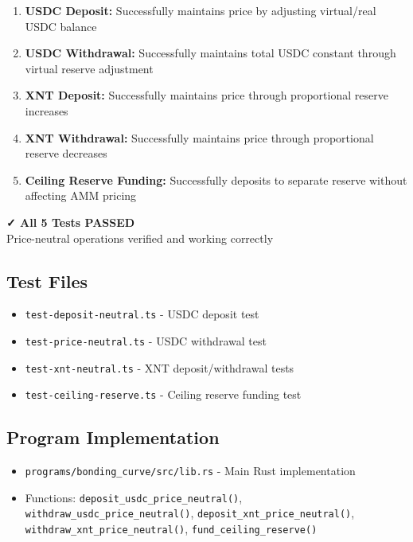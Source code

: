 \documentclass[11pt,a4paper]{article}
\begin{document}
\begin{enumerate}
    \item \textbf{USDC Deposit:} Successfully maintains price by adjusting virtual/real USDC balance
    \item \textbf{USDC Withdrawal:} Successfully maintains total USDC constant through virtual reserve adjustment
    \item \textbf{XNT Deposit:} Successfully maintains price through proportional reserve increases
    \item \textbf{XNT Withdrawal:} Successfully maintains price through proportional reserve decreases
    \item \textbf{Ceiling Reserve Funding:} Successfully deposits to separate reserve without affecting AMM pricing
\end{enumerate}

\vspace{1cm}

\begin{tcolorbox}[colback=success!10,colframe=success,width=\textwidth]
\centering
\Large\textbf{✓ All 5 Tests PASSED}\\
\vspace{0.5cm}
\normalsize Price-neutral operations verified and working correctly
\end{tcolorbox}

\vspace{2cm}

\subsection{Test Files}
\begin{itemize}
    \item \texttt{test-deposit-neutral.ts} - USDC deposit test
    \item \texttt{test-price-neutral.ts} - USDC withdrawal test
    \item \texttt{test-xnt-neutral.ts} - XNT deposit/withdrawal tests
    \item \texttt{test-ceiling-reserve.ts} - Ceiling reserve funding test
\end{itemize}

\subsection{Program Implementation}
\begin{itemize}
    \item \texttt{programs/bonding\_curve/src/lib.rs} - Main Rust implementation
    \item Functions: \texttt{deposit\_usdc\_price\_neutral()}, \texttt{withdraw\_usdc\_price\_neutral()}, \texttt{deposit\_xnt\_price\_neutral()}, \texttt{withdraw\_xnt\_price\_neutral()}, \texttt{fund\_ceiling\_reserve()}
\end{itemize}
\end{document}
